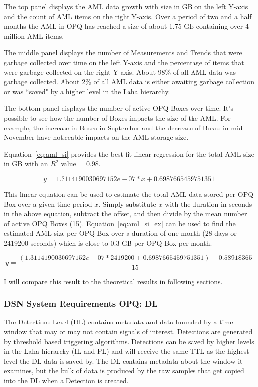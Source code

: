 The top panel displays the AML data growth with size in GB on the left Y-axis and the count of AML items on the right Y-axis. Over a period of two and a half months the AML in OPQ has reached a size of about 1.75 GB containing over 4 million AML items.

The middle panel displays the number of Measurements and Trends that were garbage collected over time on the left Y-axis and the percentage of items that were garbage collected on the right Y-axis. About 98\% of all AML data was garbage collected. About 2\% of all AML data is either awaiting garbage collection or was ``saved" by a higher level in the Laha hierarchy.

The bottom panel displays the number of active OPQ Boxes over time. It's possible to see how the number of Boxes impacts the size of the AML. For example, the increase in Boxes in September and the decrease of Boxes in mid-November have noticeable impacts on the AML storage size.

Equation~\ref{eq:aml_si} provides the best fit linear regression for the total AML size in GB with an $R^2$ value = 0.98.

\begin{equation}
    y = 1.3114190030697152e-07 * x + 0.6987665459751351
    \label{eq:aml_si}
\end{equation}

This linear equation can be used to estimate the total AML data stored per OPQ Box over a given time period $x$. Simply substitute $x$ with the duration in seconds in the above equation, subtract the offset, and then divide by the mean number of active OPQ Boxes (15). Equation~\ref{eq:aml_si_ex} can be used to find the estimated AML size per OPQ Box over a duration of one month (28 days or 2419200 seconds) which is close to 0.3 GB per OPQ Box per month.

\begin{equation}
    y = \frac{(1.3114190030697152e-07 * 2419200 + 0.6987665459751351) - 0.58918365}{15}
    \label{eq:aml_si_ex}
\end{equation}

I will compare this result to the theoretical results in following sections.

\subsubsection{DSN System Requirements OPQ: DL}

The Detections Level (DL) contains metadata and data bounded by a time window that may or may not contain signals of interest. Detections are generated by threshold based triggering algorithms. Detections can be saved by higher levels in the Laha hierarchy (IL and PL) and will receive the same TTL as the highest level the DL data is saved by. The DL contains metadata about the window it examines, but the bulk of data is produced by the raw samples that get copied into the DL when a Detection is created.


